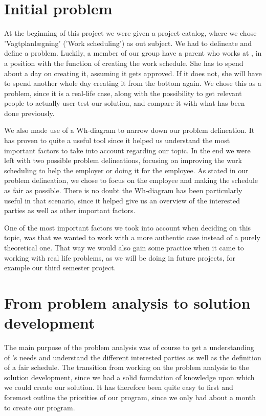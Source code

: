 \section{Initial problem} %
At the beginning of this project we were given a project-catalog, where we chose 'Vagtplanlægning' ('Work scheduling') as out subject. We had to delineate and define a problem. Luckily, a member of our group have a parent who works at \siemens, in a position with the function of creating the work schedule. She has to spend about a day on creating it, assuming it gets approved. If it does not, she will have to spend another whole day creating it from the bottom again. We chose this as a problem, since it is a real-life case, along with the possibility to get relevant people to actually user-test our solution, and compare it with what has been done previously.

We also made use of a Wh-diagram to narrow down our problem delineation. It has proven to quite a useful tool since it helped us understand the most important factors to take into account regarding our topic. In the end we were left with two possible problem delineations, focusing on improving the work scheduling to help the employer or doing it for the employee. As stated in our problem delineation, we chose to focus on the employee and making the schedule as fair as possible. There is no doubt the Wh-diagram has been particularly useful in that scenario, since it helped give us an overview of the interested parties as well as other important factors.

One of the most important factors we took into account when deciding on this topic, was that we wanted to work with a more authentic case instead of a purely theoretical one. That way we would also gain some practice when it came to working with real life problems, as we will be doing in future projects, for example our third semester project.

\section{From problem analysis to solution development}
The main purpose of the problem analysis was of course to get a understanding of \siemens's needs and understand the different interested parties as well as the definition of a fair schedule. The transition from working on the problem analysis to the solution development, since we had a solid foundation of knowledge upon which we could create our solution. It has therefore been quite easy to first and foremost outline the priorities of our program, since we only had about a month to create our program. 

